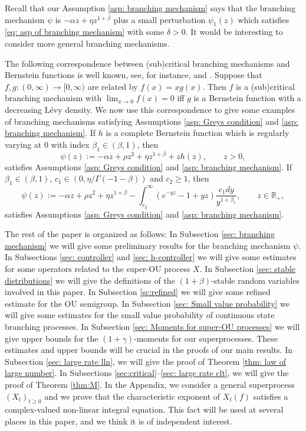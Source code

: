 \documentclass[12pt,a4paper]{amsart}
\theoremstyle{plain}
\theoremstyle{definition}
\numberwithin{equation}{section}
\begin{document}
Recall that our Assumption \ref{asp: branching mechanism} says that the branching mechanism $\psi$ is $-\alpha z +\eta z^{1+\beta}$ plus a small perturbation
$\psi_1(z)$
which satisfies \eqref{eq: asp of branching mechanism} with some $\delta>0$.
It would be interesting to consider more general branching mechanisms.

The following correspondence between (sub)critical branching mechanisms and Bernstein functions is well known, see, for instance,
\cite[Theorem VII.4(ii)]{Bertoin} and \cite[Proposition 7]{BRY}. Suppose that $f, g:(0, \infty)\to [0, \infty)$ are related by $f(x)=xg(x)$.
Then $f$ is a (sub)critical branching mechanism with $\lim_{x\to 0}f(x)=0$ iff $g$ is a Bernstein function with a decreasing L\'evy density.
We now use this correspondence to give some examples of branching mechanisms satisfying Assumptions \ref{asp: Greys condition} and \ref{asp: branching mechanism}.
If $h$ is a complete Bernstein function which is regularly varying at 0 with index $\beta_1\in (\beta, 1)$, then
\[
  \psi(z)
  := -\alpha z + \rho z^2+\eta z^{1+\beta}+zh(z)
  , \qquad z>0,
\]
satisfies Assumptions \ref{asp: Greys condition} and \ref{asp: branching mechanism}.
If $\beta_1\in (\beta, 1)$, $c_1\in (0, \eta/\Gamma(-1-\beta))$ and $c_2\ge 1$, then
\[
  \psi(z)
  :=-\alpha z + \rho z^2+\eta z^{1+\beta}-\int^\infty_{c_2} (e^{-yz}-1+yz)\frac{c_1dy}{y^{1+\beta_1}}
  , \qquad z\in \mathbb R_+,
\]
satisfies Assumptions \ref{asp: Greys condition} and \ref{asp: branching mechanism}.

The rest of the paper is organized as follows:
In Subsection \ref{sec: branching mechanism} we will give some preliminary results for the branching mechanism $\psi$.
In Subsections \ref{sec: controller} and \ref{sec: h-controller} we will give some estimates for some operators related to the super-OU process $X$.
In Subsection \ref{sec: stable distributions} we will give the definitions of the $(1+\beta)$-stable random variables involved in this paper.
In Subsection \ref{sc:refined} we will give some refined estimate for the OU semigroup.
In Subsection \ref{sec: Small value probability} we will give some estimates for the small value probability of continuous state branching processes.
In Subsection \ref{sec: Moments for super-OU processes} we will give upper bounds for the $(1+\gamma)$-moments for our superprocesses.
These estimates and upper bounds will be crucial in the proofs of our main results.
In Subsection \ref{sec: large rate lln}, we will give the proof of Theorem \ref{thm: law of large number}.
In Subsections \ref{sec:critical}--\ref{sec: large rate clt}, we will give the proof of Theorem \ref{thm:M}.
In the Appendix, we consider a general superprocess $(X_t)_{t\geq 0}$ and we prove that the characteristic exponent of $X_t(f)$ satisfies a complex-valued non-linear integral equation.
This fact will be used at several places in this paper, and we think it is of independent interest.
\end{document}
